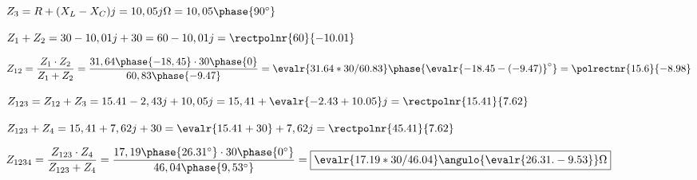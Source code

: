 \documentclass[./examen]{subfiles}
\begin{document}
$Z_3=R+(X_L-X_C)j=10,05j\Omega=10,05\phase{90^\circ}$

$Z_1+Z_2=30-10,01j+30=60-10,01j=\rectpolnr{60}{-10.01}$

\vspace{0.4cm}

$Z_{12}=\dfrac{Z_1 \cdot Z_2}{Z_1+Z_2}=\dfrac{31,64\phase{-18,45} \cdot 30\phase{0}}{60,83\phase{-9.47}}=\evalr{31.64*30/60.83}\phase{\evalr{-18.45-(-9.47)}^\circ}=\polrectnr{15.6}{-8.98}$

\vspace{0.4cm}

$Z_{123}=Z_{12}+Z_3=15.41-2,43j+10,05j=15,41+\evalr{-2.43+10.05}j=\rectpolnr{15.41}{7.62}$

\vspace{0.4cm}

$Z_{123}+Z_4=15,41+7,62j+30=\evalr{15.41+30}+7,62j=\rectpolnr{45.41}{7.62}$

\vspace{0.4cm}

$Z_{1234}=\dfrac{Z_{123}\cdot Z_4}{Z_{123}+ Z_4}=\dfrac{17,19\phase{26.31^\circ} \cdot 30 \phase{0^\circ}}{46,04\phase{9,53^\circ}}=\fbox{$ \evalr{17.19*30/46.04}\angulo{\evalr{26.31.-9.53}}\Omega$}$
\end{document}
